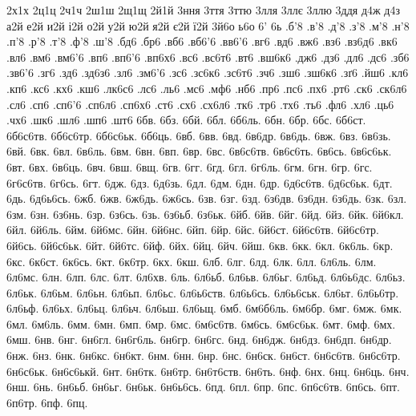{2х1х 2ц1ц 2ч1ч 2ш1ш 2щ1щ 2й1й
3ння 3ття 3ттю 3лля 3ллє 3ллю 3ддя
д4ж д4з
а2й е2й и2й і2й о2й у2й ю2й я2й є2й ї2й 3й6о
ь6о 6' 6ь
.б'8 .в'8 .д'8 .з'8 .м'8 .н'8 .п'8 .р'8
.т'8 .ф'8 .ш'8 .бд6 .бр6 .вб6 .вб6'6 .вв6'6
.вг6 .вд6 .вж6 .вз6 .вз6д6 .вк6 .вл6 .вм6
.вм6'6 .вп6 .вп6'6 .вп6х6 .вс6 .вс6т6 .вт6 .вш6к6
.дж6 .дз6 .дл6 .дс6 .зб6 .зв6'6 .зг6 .зд6
.зд6з6 .зл6 .зм6'6 .зс6 .зс6к6 .зс6т6 .зч6 .зш6
.зш6к6 .зґ6 .йш6 .кл6 .кп6 .кс6 .кх6 .кш6
.лк6с6 .лс6 .ль6 .мс6 .мф6 .нб6 .пр6 .пс6
.пх6 .рт6 .ск6 .ск6л6 .сл6 .сп6 .сп6'6 .сп6л6
.сп6х6 .ст6 .сх6 .сх6л6 .тк6 .тр6 .тх6 .ть6
.фл6 .хл6 .ць6 .чх6 .шк6 .шл6 .шп6 .шт6
6бв. 6бз. 6бй. 6бл. 6б6ль. 6бн. 6бр. 6бс.
6б6ст. 6б6с6тв. 6б6с6тр. 6б6с6ьк. 6б6ць. 6вб. 6вв. 6вд.
6в6др. 6в6дь. 6вж. 6вз. 6в6зь. 6вй. 6вк. 6вл.
6в6ль. 6вм. 6вн. 6вп. 6вр. 6вс. 6в6с6тв. 6в6с6ть.
6в6сь. 6в6с6ьк. 6вт. 6вх. 6в6ць. 6вч. 6вш. 6вщ.
6гв. 6гг. 6гд. 6гл. 6г6ль. 6гм. 6гн. 6гр.
6гс. 6г6с6тв. 6г6сь. 6гт. 6дж. 6дз. 6д6зь. 6дл.
6дм. 6дн. 6др. 6д6с6тв. 6д6с6ьк. 6дт. 6дь. 6д6ь6сь.
6жб. 6жв. 6ж6дь. 6ж6сь. 6зв. 6зг. 6зд. 6з6дв.
6з6дн. 6з6дь. 6зк. 6зл. 6зм. 6зн. 6з6нь. 6зр.
6з6сь. 6зь. 6з6ьб. 6з6ьк. 6йб. 6йв. 6йг. 6йд.
6йз. 6йк. 6й6кл. 6йл. 6й6ль. 6йм. 6й6мс. 6йн.
6й6нс. 6йп. 6йр. 6йс. 6й6ст. 6й6с6тв. 6й6с6тр. 6й6сь.
6й6с6ьк. 6йт. 6й6тс. 6йф. 6йх. 6йц. 6йч. 6йш.
6кв. 6кк. 6кл. 6к6ль. 6кр. 6кс. 6к6ст. 6к6сь.
6кт. 6к6тр. 6кх. 6кш. 6лб. 6лг. 6лд. 6лк.
6лл. 6л6ль. 6лм. 6л6мс. 6лн. 6лп. 6лс. 6лт.
6л6хв. 6ль. 6л6ьб. 6л6ьв. 6л6ьг. 6л6ьд. 6л6ь6дс. 6л6ьз.
6л6ьк. 6л6ьм. 6л6ьн. 6л6ьп. 6л6ьс. 6л6ь6ств. 6л6ь6сь. 6л6ь6ськ.
6л6ьт. 6л6ь6тр. 6л6ьф. 6л6ьх. 6л6ьц. 6л6ьч. 6л6ьш. 6л6ьщ.
6мб. 6м6б6ль. 6м6бр. 6мг. 6мж. 6мк. 6мл. 6м6ль.
6мм. 6мн. 6мп. 6мр. 6мс. 6м6с6тв. 6м6сь. 6м6с6ьк.
6мт. 6мф. 6мх. 6мш. 6нв. 6нг. 6н6гл. 6н6г6ль.
6н6гр. 6н6гс. 6нд. 6н6дж. 6н6дз. 6н6дп. 6н6др. 6нж.
6нз. 6нк. 6н6кс. 6н6кт. 6нм. 6нн. 6нр. 6нс.
6н6ск. 6н6ст. 6н6с6тв. 6н6с6тр. 6н6с6ьк. 6н6с6ькй. 6нт. 6н6тк.
6н6тр. 6н6т6ств. 6н6ть. 6нф. 6нх. 6нц. 6н6ць. 6нч.
6нш. 6нь. 6н6ьб. 6н6ьг. 6н6ьк. 6н6ь6сь. 6пд. 6пл.
6пр. 6пс. 6п6с6тв. 6п6сь. 6пт. 6п6тр. 6пф. 6пц.
}
